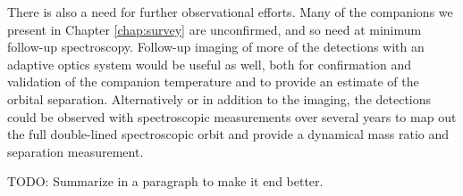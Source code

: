 \documentclass{utthesis}
\begin{document}
There is also a need for further observational efforts. Many of the companions we present in Chapter \ref{chap:survey} are unconfirmed, and so need at minimum follow-up spectroscopy. Follow-up imaging of more of the detections with an adaptive optics system would be useful as well, both for confirmation and validation of the companion temperature and to provide an estimate of the orbital separation. Alternatively or in addition to the imaging, the detections could be observed with spectroscopic measurements over several years to map out the full double-lined spectroscopic orbit and provide a dynamical mass ratio and separation measurement. 


TODO: Summarize in a paragraph to make it end better.







\backmatter

\printindex

\cleardoublepage
{}

\end{document}
